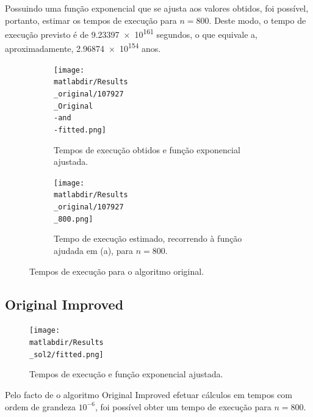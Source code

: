 \documentclass[portuguese,11pt,a4paper,titlepage]{article}
\newcommand{\matlabdir}{"../MATLAB fittings"}
\begin{document}
Possuindo uma função exponencial que se ajusta aos valores obtidos, foi possível,
portanto, estimar os tempos de execução para \begin{math}n = 800\end{math}.
Deste modo, o tempo de execução previsto é de \num{9.23397e+161} segundos,
o que equivale a, aproximadamente, \num{2.96874e+154} anos.

\begin{figure}[h]
	\begin{subfigure}{0.47\textwidth}
	\texttt{[image: \\matlabdir/Results\\\_original/107927\\\_Original\\-and\\-fitted.png]} 
	\caption{Tempos de execução obtidos e função exponencial ajustada.}
	\label{fig:subim1}
	\end{subfigure}
	\hspace{0.049\textwidth}
	\begin{subfigure}{0.47\textwidth}
	\texttt{[image: \\matlabdir/Results\\\_original/107927\\\_800.png]}
	\caption{Tempo de execução estimado, recorrendo à função ajudada em (a), para \begin{math}n=800\end{math}.}
	\label{fig:original_800}
	\end{subfigure}
	
	\caption{Tempos de execução para o algoritmo original.}
	\vspace{-20pt}
	\label{fig:original}
\end{figure}

\subsection{Original Improved}
\begin{figure}
	\vspace{-13pt}
	\texttt{[image: \\matlabdir/Results\\\_sol2/fitted.png]}
	\caption{Tempos de execução e função exponencial ajustada.}
	\label{fig:sol2}
\end{figure}
	
Pelo facto de o algoritmo Original Improved efetuar cálculos em tempos com ordem de grandeza
\begin{math}10^{-6}\end{math}, foi possível obter um tempo de execução para \begin{math}n = 800\end{math}.
\end{document}
